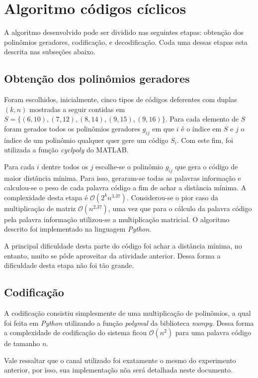 \section{Algoritmo códigos cíclicos}
A algoritmo desenvolvido pode ser dividido nas seguintes etapas: obtenção dos polinômios geradores, codificação, e decodificação. Coda uma dessas etapas esta descrita nas subseções abaixo.

\subsection{Obtenção dos polinômios geradores}
Foram escolhidos, inicialmente, cinco tipos de códigos deferentes com duplas $(k, n)$ mostradas a seguir contidas em $S = \{(6, 10), (7, 12), (8, 14), (9, 15), (9, 16)\}$. Para cada elemento de $S$ foram gerados todos os polinômios geradores $g_{ij}$ em que $i$ é o índice em $S$ e $j$ o índice de um polinômio qualquer quer gere um código $S_i$. Com este fim, foi utilizada a função \textit{cyclpoly} do MATLAB.

Para cada $i$ dentre todos os $j$ escolhe-se o polinômio $g_{ij}$ que gera o código de maior distância mínima. Para isso, geraram-se todas as palavras informação e calculou-se o peso de cada palavra código a fim de achar a distância mínima. A complexidade desta etapa é $\mathcal{O}(2^kn^{3.37})$. Considerou-se o pior caso da multiplicação de matriz $\mathcal{O}(n^{2.37})$, uma vez que para o cálculo da palavra código pela palavra informação utilizou-se a multiplicação matricial. O algoritmo descrito foi implementado na linguagem \textit{Python}.

A principal dificuldade desta parte do código foi achar a distância mínima, no entanto, muito se pôde aproveitar da atividade anterior. Dessa forma a dificuldade desta etapa não foi tão grande.

\subsection{Codificação}

A codificação consistiu simplesmente de uma multiplicação de polinômios, a qual foi feita em \textit{Python} utilizando a função \textit{polymul} da biblioteca \textit{numpy}. Dessa forma a complexidade de codificação do sistema ficou $\mathcal{O}(n^2)$ para uma palavra código de tamanho $n$.

Vale ressaltar que o canal utilizado foi exatamente o mesmo do experimento anterior, por isso, sua implementação nõa será detalhada neste documento.

